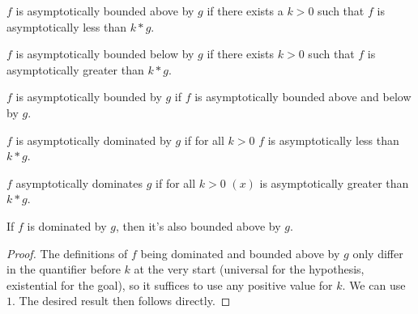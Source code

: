 \begin{definition}
    \label{def:asymp_bounded_above}
    \leanok
    $f$ is asymptotically bounded above by $g$ if there exists a $k > 0$ 
    such that $f$ is asymptotically less than $k*g$.
\end{definition}

\begin{definition}
    \label{def:asymp_bounded_below}
    \leanok
    $f$ is asymptotically bounded below by $g$ if there exists $k > 0$ 
    such that $f$ is asymptotically greater than $k*g$.
\end{definition}

\begin{definition}
    \label{def:asymp_bounded}
    \leanok
    $f$ is asymptotically bounded by $g$ if $f$ is asymptotically bounded
    above and below by $g$.
\end{definition}

\begin{definition}
    \label{def:asymp_right_dom}
    \leanok
    $f$ is asymptotically dominated by $g$ if for all $k > 0$ $f$ is asymptotically 
    less than $k*g$.

\end{definition}

\begin{definition}
    \label{def:asymp_left_dom}
    \leanok
    $f$ asymptotically dominates $g$ if for all $k > 0$ $(x)$ is asymptotically
    greater than $k*g$.

\end{definition}

\begin{lemma}
    \label{lemma:asymp_bounded_above_of_right_dom}
    \leanok
    If $f$ is dominated by $g$, then it's also bounded above by $g$.
\end{lemma}

\begin{proof}
    \leanok 
    The definitions of $f$ being dominated and bounded above by $g$ only differ
    in the quantifier before $k$ at the very start (universal for the hypothesis, existential
    for the goal), so it suffices to use any positive value for $k$. We can use $1$. 
    The desired result then follows directly.
\end{proof}

